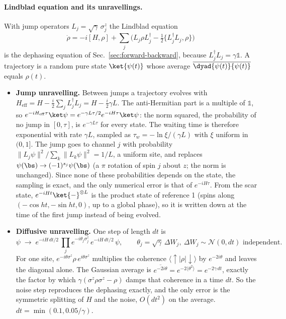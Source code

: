 \paragraph{Lindblad equation and its unravellings.} With jump operators $L_j = \sqrt\gamma\,\sigma^z_j$ the Lindblad equation
\begin{equation}
\dot\rho = -i[H, \rho] + \sum_j\Big(L_j\rho L_j^\dagger - \tfrac12\{L_j^\dagger L_j, \rho\}\Big)
\end{equation}
is the dephasing equation of Sec.~\ref{sec:forward-backward}, because $L_j^\dagger L_j = \gamma\mathds 1$. A trajectory is a random pure state $\ket{\psi(t)}$ whose average $\overline{\dyad{\psi(t)}{\psi(t)}}$ equals $\rho(t)$.
\begin{itemize}
\item \textbf{Jump unravelling.} Between jumps a trajectory evolves with $H_{\mathrm{eff}} = H - \tfrac i2\sum_j L_j^\dagger L_j = H - \tfrac{i}{2}\gamma L$. The anti-Hermitian part is a multiple of $\mathds 1$, so $e^{-iH_{\mathrm{eff}}\tau}\ket\psi = e^{-\gamma L\tau/2}e^{-iH\tau}\ket\psi$: the norm squared, the probability of no jump in $[0, \tau]$, is $e^{-\gamma L\tau}$ for every state. The waiting time is therefore exponential with rate $\gamma L$, sampled as $\tau_w = -\ln\xi/(\gamma L)$ with $\xi$ uniform in $(0, 1]$. The jump goes to channel $j$ with probability $\lVert L_j\psi\rVert^2/\sum_k\lVert L_k\psi\rVert^2 = 1/L$, a uniform site, and replaces $\psi(\bs) \to (-1)^{s_j}\psi(\bs)$ (a $\pi$ rotation of spin $j$ about $z$; the norm is unchanged). Since none of these probabilities depends on the state, the sampling is exact, and the only numerical error is that of $e^{-iH\tau}$. From the scar state, $e^{-iHt}\ket{-}^{\otimes L}$ is the product state of reference 1 (spins along $(-\cos ht, -\sin ht, 0)$, up to a global phase), so it is written down at the time of the first jump instead of being evolved.
\item \textbf{Diffusive unravelling.} One step of length $dt$ is
\[ \psi \;\to\; e^{-iH\,dt/2}\,\prod_j e^{-i\theta_j\sigma^z_j}\,e^{-iH\,dt/2}\,\psi, \qquad \theta_j = \sqrt\gamma\,\Delta W_j,\ \Delta W_j \sim \mathcal N(0, dt) \text{ independent}. \]
For one site, $e^{-i\theta\sigma^z}\rho\,e^{i\theta\sigma^z}$ multiplies the coherence $\langle\uparrow\vert\rho\vert\downarrow\rangle$ by $e^{-2i\theta}$ and leaves the diagonal alone. The Gaussian average is $\overline{e^{-2i\theta}} = e^{-2\langle\theta^2\rangle} = e^{-2\gamma\,dt}$, exactly the factor by which $\gamma(\sigma^z\rho\sigma^z - \rho)$ damps that coherence in a time $dt$. So the noise step reproduces the dephasing exactly, and the only error is the symmetric splitting of $H$ and the noise, $O(dt^2)$ on the average. $dt = \min(0.1, 0.05/\gamma)$.
\end{itemize}

